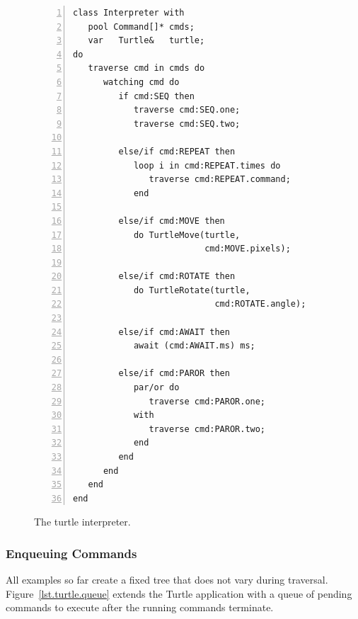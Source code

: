 \documentclass{acm_proc_article-sp}
\begin{document}
\begin{figure}%
\begin{lstlisting}[numbers=left,xleftmargin=3em]
class Interpreter with
   pool Command[]* cmds;
   var   Turtle&   turtle;
do
   traverse cmd in cmds do
      watching cmd do
         if cmd:SEQ then
            traverse cmd:SEQ.one;
            traverse cmd:SEQ.two;

         else/if cmd:REPEAT then
            loop i in cmd:REPEAT.times do
               traverse cmd:REPEAT.command;
            end

         else/if cmd:MOVE then
            do TurtleMove(turtle,
                          cmd:MOVE.pixels);

         else/if cmd:ROTATE then
            do TurtleRotate(turtle,
                            cmd:ROTATE.angle);

         else/if cmd:AWAIT then
            await (cmd:AWAIT.ms) ms;

         else/if cmd:PAROR then
            par/or do
               traverse cmd:PAROR.one;
            with
               traverse cmd:PAROR.two;
            end
         end
      end
   end
end
\end{lstlisting}
\caption{ The turtle interpreter.
\label{lst.turtle.interpreter}
}
\end{figure}

\subsubsection{Enqueuing Commands}
\label{sub.enqueuing}

All examples so far create a fixed tree that does not vary during traversal.
%
Figure~\ref{lst.turtle.queue} extends the Turtle application with a queue of 
pending commands to execute after the running commands terminate.
\end{document}
